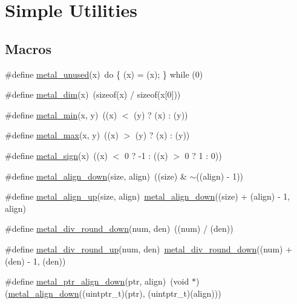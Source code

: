 \hypertarget{group__utilities}{}\section{Simple Utilities}
\label{group__utilities}
\subsection*{Macros}
\begin{DoxyCompactItemize}
\item 
\#define \hyperlink{group__utilities_ga731379b7002ae0ebd74eefe656064f2a}{metal\+\_\+unused}(x)~do \{ (x) = (x); \} while (0)
\item 
\#define \hyperlink{group__utilities_ga28bf3f83d2efd1c6fb6b5bf63162ad32}{metal\+\_\+dim}(x)~(sizeof(x) / sizeof(x\mbox{[}0\mbox{]}))
\item 
\#define \hyperlink{group__utilities_ga9ea8974801fa4d6b7769097f5da5a68b}{metal\+\_\+min}(x,  y)~((x) $<$ (y) ? (x) \+: (y))
\item 
\#define \hyperlink{group__utilities_ga4e7658a6bfc47722c6dbf37b2b15278c}{metal\+\_\+max}(x,  y)~((x) $>$ (y) ? (x) \+: (y))
\item 
\#define \hyperlink{group__utilities_ga7648611485a94eb9594ab64645052cda}{metal\+\_\+sign}(x)~((x) $<$ 0 ? -\/1 \+: ((x) $>$ 0 ? 1 \+: 0))
\item 
\#define \hyperlink{group__utilities_ga156203f45b1730445ff94ea22f619917}{metal\+\_\+align\+\_\+down}(size,  align)~((size) \& $\sim$((align) -\/ 1))
\item 
\#define \hyperlink{group__utilities_ga416a17445a84ce264d90616960082f51}{metal\+\_\+align\+\_\+up}(size,  align)~\hyperlink{group__utilities_ga156203f45b1730445ff94ea22f619917}{metal\+\_\+align\+\_\+down}((size) + (align) -\/ 1, align)
\item 
\#define \hyperlink{group__utilities_ga86077c41e1fb0d755b406d07213aecae}{metal\+\_\+div\+\_\+round\+\_\+down}(num,  den)~((num) / (den))
\item 
\#define \hyperlink{group__utilities_gace231318276c47f6e2fbc12e61fd5b7c}{metal\+\_\+div\+\_\+round\+\_\+up}(num,  den)~\hyperlink{group__utilities_ga86077c41e1fb0d755b406d07213aecae}{metal\+\_\+div\+\_\+round\+\_\+down}((num) + (den) -\/ 1, (den))
\item 
\#define \hyperlink{group__utilities_gaf31231a9208f8a5474f3c72dff89fab9}{metal\+\_\+ptr\+\_\+align\+\_\+down}(ptr,  align)~(void $\ast$)(\hyperlink{group__utilities_ga156203f45b1730445ff94ea22f619917}{metal\+\_\+align\+\_\+down}((uintptr\+\_\+t)(ptr), (uintptr\+\_\+t)(align)))

\end{DoxyCompactItemize}
